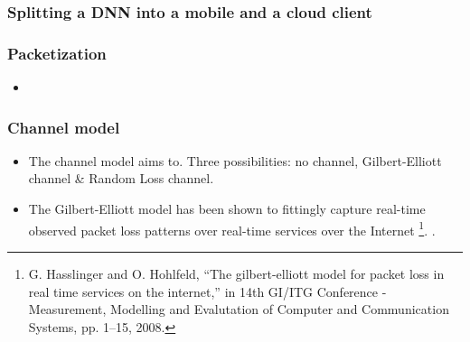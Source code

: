 \documentclass{beamer}
\begin{document}
\begin{frame}
	\frametitle{Splitting a DNN into a mobile and a cloud client}
\end{frame}

\begin{frame}
	\frametitle{Packetization}
	\begin{itemize}
		\item 
	\end{itemize}
\end{frame}

\begin{frame}
	\frametitle{Channel model}
	\begin{itemize}
	\item The channel model aims to. Three possibilities: no channel, Gilbert-Elliott channel \& Random Loss channel.
	\item The Gilbert-Elliott model has been shown to fittingly capture real-time observed packet loss patterns over real-time services over the Internet \footnote{\tiny{G. Hasslinger and O. Hohlfeld, “The gilbert-elliott model for packet loss in real time services on the internet,” in 14th GI/ITG Conference - Measurement, Modelling and Evalutation of Computer and Communication Systems, pp. 1–15, 2008.}}. \cite{5755057}.
\end{itemize}
\end{frame}
\end{document}
